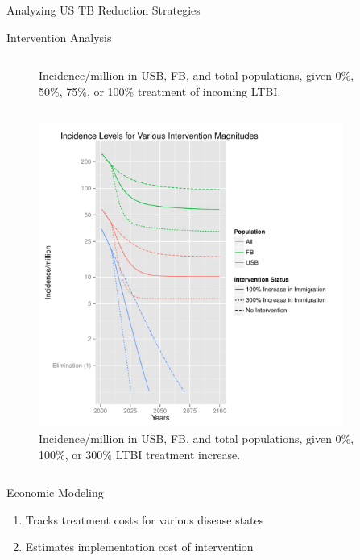 \documentclass[final]{beamer}
\begin{document}
\begin{frame}
\begin{columns}
\begin{column}{.3\textwidth}
\begin{block}{Analyzing US TB Reduction Strategies}
\begin{block}{Intervention Analysis}
\begin{column}{.45\textwidth}
\begin{figure}[h]
\begin{center}
              \end{center}
              \caption{Incidence/million in USB, FB, and total populations,
                       given 0\%, 50\%, 75\%, or 100\% treatment of incoming
                       LTBI.}
              \label{fig:redEnLTBI_incidence}
            \end{figure}
          \end{column}
          \begin{column}{.45\textwidth}
            \begin{figure}[h]
              \begin{center}
                \includegraphics[height=10cm,width=\textwidth]{incLTBItrmtIncGrouped}
              \end{center}
              \caption{Incidence/million in USB, FB, and total populations,
                       given 0\%, 100\%, or 300\% LTBI treatment increase.}
              \label{fig:incLTBItrmt_incidence}
            \end{figure}
          \end{column}
        \end{block}
      \end{block}
      \begin{block}{Economic Modeling}
        \begin{enumerate}
          \item Tracks treatment costs for various disease states
          \item Estimates implementation cost of intervention
        \end{enumerate}
        \begin{block}{}

\end{block}
\end{block}
\end{column}
\end{columns}
\end{frame}
\end{document}
